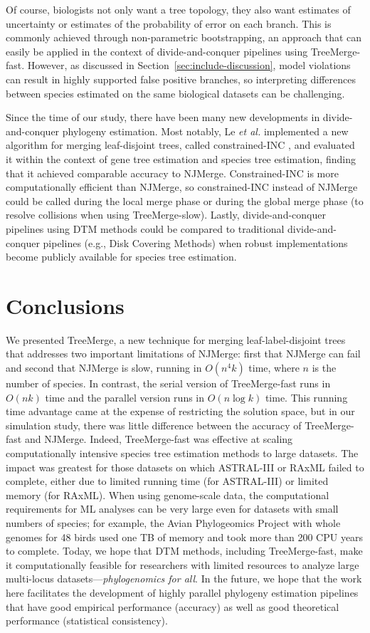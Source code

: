 Of course, biologists not only want a tree topology, they also want estimates of uncertainty or estimates of the probability of error on each branch.
This is commonly achieved through non-parametric bootstrapping, an approach that can easily be applied in the context of divide-and-conquer pipelines using TreeMerge-fast. 
However, as discussed in Section~\ref{sec:include-discussion}, model violations can result in highly supported false positive branches, so interpreting differences between species estimated on the same biological datasets can be challenging.

Since the time of our study, there have been many new developments in divide-and-conquer phylogeny estimation. 
Most notably, Le {\em et al.} \cite{thien2019using} implemented a new algorithm for merging leaf-disjoint trees, called constrained-INC \cite{zhang2018constrained}, and evaluated it within the context of gene tree estimation and species tree estimation, finding that it achieved comparable accuracy to NJMerge. 
Constrained-INC is more computationally efficient than NJMerge, so constrained-INC instead of NJMerge could be called during the local merge phase or during the global merge phase (to resolve collisions when using TreeMerge-slow). 
Lastly, divide-and-conquer pipelines using DTM methods could be compared to traditional divide-and-conquer pipelines (e.g., Disk Covering Methods) when robust implementations become publicly available for species tree estimation.

\section{Conclusions}
\label{sec:conclusion}
We presented TreeMerge, a new technique for merging leaf-label-disjoint trees that addresses two important limitations of NJMerge: first that NJMerge can fail and second that NJMerge is slow, running in $O(n^4k)$ time, where $n$ is the number of species.
In contrast, the serial version of TreeMerge-fast runs in $O(nk)$ time and the parallel version runs in $O(n \log{k})$ time.
This running time advantage came at the expense of restricting the solution space, but in our simulation study, there was little difference between the accuracy of TreeMerge-fast and NJMerge.
Indeed, TreeMerge-fast was effective at scaling computationally intensive species tree estimation methods to large datasets.
The impact was greatest for those datasets on which ASTRAL-III or RAxML failed to complete, either due to limited running time (for ASTRAL-III) or limited memory (for RAxML).  
When using \gls{genome-scale} data, the computational requirements for ML analyses can be very large even for datasets with small numbers of species; for example, the Avian Phylogeomics Project with whole genomes for 48 birds used one TB of memory and took more than 200 CPU years to complete.
Today, we hope that DTM methods, including TreeMerge-fast, make it computationally feasible for researchers with limited resources to analyze large multi-locus datasets---{\em phylogenomics for all}.
In the future, we hope that the work here facilitates the development of highly parallel phylogeny estimation pipelines that have good empirical performance (accuracy) as well as good theoretical performance (statistical consistency).

